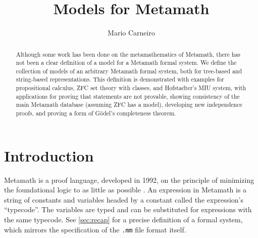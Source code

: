 \documentclass[runningheads,a4paper]{llncs}
\begin{document}
\mainmatter  %

\title{Models for Metamath}


\author{Mario Carneiro}
%


\maketitle


\begin{abstract}
Although some work has been done on the metamathematics of Metamath, there has not been a clear definition of a model for a Metamath formal system.  We define the collection of models of an arbitrary Metamath formal system, both for tree-based and string-based representations.  This definition is demonstrated with examples for propositional calculus, \textsf{ZFC} set theory with classes, and Hofstadter's MIU system, with applications for proving that statements are not provable, showing consistency of the main Metamath database (assuming \textsf{ZFC} has a model), developing new independence proofs, and proving a form of G\"{o}del's completeness theorem.
\end{abstract}


\section{Introduction}\label{sec:intro}

Metamath is a proof language, developed in 1992, on the principle of minimizing the foundational logic to as little as possible \cite{metamath}. An expression in Metamath is a string of constants and variables headed by a constant called the expression's ``typecode''. The variables are typed and can be substituted for expressions with the same typecode.  See \autoref{sec:recap} for a precise definition of a formal system, which mirrors the specification of the \texttt{.mm} file format itself.
\end{document}
